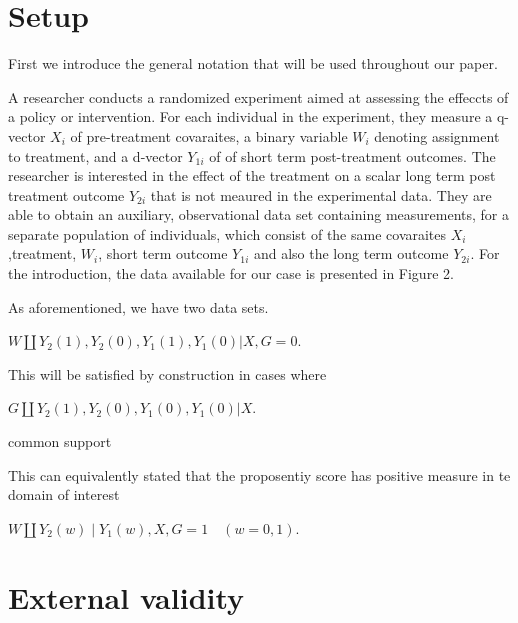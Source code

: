 \documentclass{article}
\begin{document}
\section{Setup}

First we introduce the general notation that will be used throughout our paper.

A researcher conducts a randomized experiment aimed at assessing the effeccts of a policy or intervention. For each individual in the experiment, they measure a q-vector $X_i$ of pre-treatment covaraites, a binary variable $W_i$ denoting assignment to treatment, and a d-vector $Y_{1i}$ of of short term post-treatment outcomes. The researcher is interested in the effect of the treatment on a scalar long term post treatment outcome $Y_{2i} $ that is not meaured in the experimental data. They are able to obtain an auxiliary, observational data set containing measurements, for a separate population of individuals, which consist of the same covaraites $X_i $,treatment, $W_i$, short term outcome $Y_{1i} $ and also the long term outcome $Y_{2i}$. 
For the introduction, the data available for our case is presented in Figure 2. 

As aforementioned, we have two data sets. 

\begin{assumption}\label{ass: exp1}
    $W \amalg Y_2(1), Y_2(0), Y_1(1), Y_1(0) | X, G=0$.
\end{assumption}

This will be satisfied by construction in cases where 

\begin{assumption}\label{ass: ex1}
    $G \amalg Y_2(1), Y_2(0), Y_1(0), Y_1(0) | X$.
\end{assumption}

\begin{assumption}
    common support
\end{assumption}

This can equivalently stated that the proposentiy score has positive measure in te domain of interest

\begin{assumption} 
    $W \amalg Y_2(w) \mid Y_1(w), X, G=1\quad(w =0,1)$.
\end{assumption}

\section{External validity}
\end{document}
